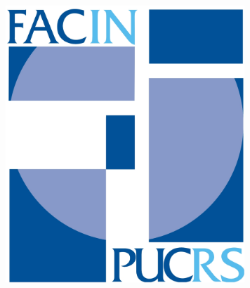\documentclass[a0,portrait]{a0poster}
\begin{document}
\begin{minipage}[c]{\linewidth}
{	\begin{minipage}[c]{0.15\linewidth}
		\begin{center}
			\includegraphics[width=9cm]{fig/facin-logo.pdf}
		\end{center}
	\end{minipage}}
	\\[0.1cm]%
\end{minipage}

\vspace{1cm}

\end{document}
